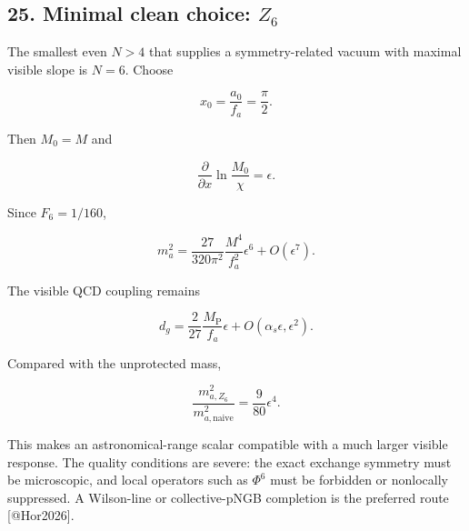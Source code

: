 \documentclass[
]{article}
\begin{document}
\hypertarget{minimal-clean-choice-z_6}{%
\subsection{\texorpdfstring{25. Minimal clean choice:
\(Z_6\)}{25. Minimal clean choice: Z\_6}}\label{minimal-clean-choice-z_6}}

The smallest even \(N>4\) that supplies a symmetry-related vacuum with
maximal visible slope is \(N=6\). Choose

\[
x_0=\frac{a_0}{f_a}=\frac\pi2.
\]

Then \(M_0=M\) and

\[
\frac{\partial}{\partial x}
\ln\frac{M_0}{\chi}=\epsilon.
\]

Since \(F_6=1/160\),

\[
\boxed{
m_a^2
=\frac{27}{320\pi^2}
\frac{M^4}{f_a^2}\epsilon^6+O(\epsilon^7).
}
\]

The visible QCD coupling remains

\[
\boxed{
d_g=\frac{2}{27}\frac{M_{\mathrm{P}}}{f_a}\epsilon
+O(\alpha_s\epsilon,\epsilon^2).
}
\]

Compared with the unprotected mass,

\[
\boxed{
\frac{m_{a,Z_6}^2}{m_{a,\mathrm{naive}}^2}
=\frac9{80}\epsilon^4.
}
\]

This makes an astronomical-range scalar compatible with a much larger
visible response. The quality conditions are severe: the exact exchange
symmetry must be microscopic, and local operators such as \(\Phi^6\)
must be forbidden or nonlocally suppressed. A Wilson-line or
collective-pNGB completion is the preferred route {[}@Hor2026{]}.
\end{document}
